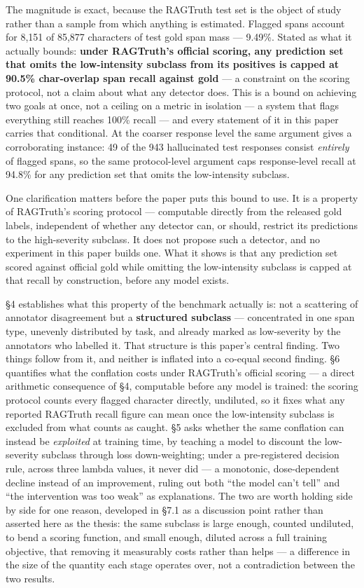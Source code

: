 \documentclass[11pt]{article}
\begin{document}
The magnitude is exact, because the RAGTruth test set is the object of study rather than a
sample from which anything is estimated. Flagged spans account for 8,151 of 85,877
characters of test gold span mass --- 9.49\%. Stated as what it actually bounds: \textbf{under
RAGTruth's official scoring, any prediction set that omits the low-intensity subclass from
its positives is capped at 90.5\% char-overlap span recall against gold} --- a constraint on
the scoring protocol, not a claim about what any detector does. This is a bound on achieving
two goals at once, not a ceiling on a metric in isolation --- a system that flags everything
still reaches 100\% recall --- and every statement of it in this paper carries that
conditional. At the coarser response level the same argument gives a corroborating
instance: 49 of the 943 hallucinated test responses consist \emph{entirely} of flagged spans, so
the same protocol-level argument caps response-level recall at 94.8\% for any prediction set
that omits the low-intensity subclass.

One clarification matters before the paper puts this bound to use. It is a property of
RAGTruth's scoring protocol --- computable directly from the released gold labels,
independent of whether any detector can, or should, restrict its predictions to the
high-severity subclass. It does not propose such a detector, and no experiment in this
paper builds one. What it shows is that any prediction set scored against official gold
while omitting the low-intensity subclass is capped at that recall by construction, before
any model exists.

§4 establishes what this property of the benchmark actually is: not a scattering of
annotator disagreement but a \textbf{structured subclass} --- concentrated in one span type,
unevenly distributed by task, and already marked as low-severity by the annotators who
labelled it. That structure is this paper's central finding. Two things follow from it, and
neither is inflated into a co-equal second finding. §6 quantifies what the conflation costs
under RAGTruth's official scoring --- a direct arithmetic consequence of §4, computable before
any model is trained: the scoring protocol counts every flagged character directly,
undiluted, so it fixes what any reported RAGTruth recall figure can mean once the
low-intensity subclass is excluded from what counts as caught. §5 asks whether the same
conflation can instead be \emph{exploited} at training time, by teaching a model to discount the
low-severity subclass through loss down-weighting; under a pre-registered decision rule,
across three lambda values, it never did --- a monotonic, dose-dependent decline instead of an
improvement, ruling out both ``the model can't tell'' and ``the intervention was too weak'' as
explanations. The two are worth holding side by side for one reason, developed in §7.1 as a
discussion point rather than asserted here as the thesis: the same subclass is large enough,
counted undiluted, to bend a scoring function, and small enough, diluted across a full
training objective, that removing it measurably costs rather than helps --- a difference in
the size of the quantity each stage operates over, not a contradiction between the two
results.
\end{document}
